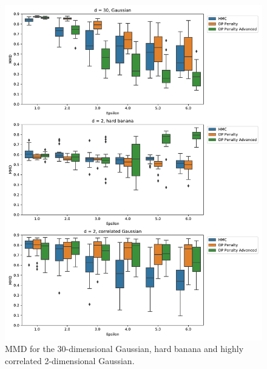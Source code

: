 \documentclass[english,twoside,openright]{HYgraduMLDS}
\begin{document}
\begin{figure}
  \centering
  \includegraphics[width=\textwidth]{figures/banana_extra.pdf}
  \caption{
    MMD for the 30-dimensional Gaussian, hard banana and highly correlated
    2-dimensional Gaussian.
  }
  \label{banana_extra_mmd_fig}
\end{figure}
\end{document}
